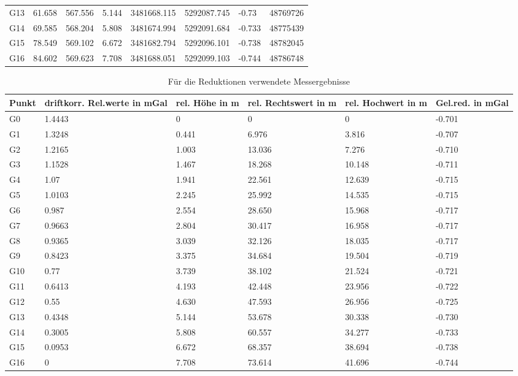 \begin{landscape}
\begin{table}[!ht]
\begin{tabular}{llllllll}
G13   & 61.658            & 567.556      & 5.144         & 3481668.115    & 5292087.745  & -0.73           & 48769726      \\
G14   & 69.585            & 568.204      & 5.808         & 3481674.994    & 5292091.684  & -0.733          & 48775439      \\
G15   & 78.549            & 569.102      & 6.672         & 3481682.794    & 5292096.101  & -0.738          & 48782045      \\
G16   & 84.602            & 569.623      & 7.708         & 3481688.051    & 5292099.103  & -0.744          & 48786748     \\
\bottomrule
\end{tabular}
\end{table}
\end{landscape}

\begin{landscape}
\begin{table}[!ht]
\centering
\caption{Für die Reduktionen verwendete Messergebnisse}
\label{tab:fuerred}
\begin{tabular}{llllll}
\toprule
Punkt & driftkorr. Rel.werte in mGal & rel. Höhe in m & rel. Rechtswert in m & rel. Hochwert in m & Gel.red. in mGal \\
\midrule
G0  & 1.4443 & 0     & 0      & 0      & -0.701 \\
G1  & 1.3248 & 0.441 & 6.976  & 3.816  & -0.707 \\
G2  & 1.2165 & 1.003 & 13.036 & 7.276  & -0.710 \\
G3  & 1.1528 & 1.467 & 18.268 & 10.148 & -0.711 \\
G4  & 1.07   & 1.941 & 22.561 & 12.639 & -0.715 \\
G5  & 1.0103 & 2.245 & 25.992 & 14.535 & -0.715 \\
G6  & 0.987  & 2.554 & 28.650 & 15.968 & -0.717 \\
G7  & 0.9663 & 2.804 & 30.417 & 16.958 & -0.717 \\
G8  & 0.9365 & 3.039 & 32.126 & 18.035 & -0.717 \\
G9  & 0.8423 & 3.375 & 34.684 & 19.504 & -0.719 \\
G10 & 0.77   & 3.739 & 38.102 & 21.524 & -0.721 \\
G11 & 0.6413 & 4.193 & 42.448 & 23.956 & -0.722 \\
G12 & 0.55   & 4.630 & 47.593 & 26.956 & -0.725 \\
G13 & 0.4348 & 5.144 & 53.678 & 30.338 & -0.730 \\
G14 & 0.3005 & 5.808 & 60.557 & 34.277 & -0.733 \\
G15 & 0.0953 & 6.672 & 68.357 & 38.694 & -0.738 \\
G16 & 0      & 7.708 & 73.614 & 41.696 & -0.744 \\
\bottomrule
\end{tabular}
\end{table}
\end{landscape}

